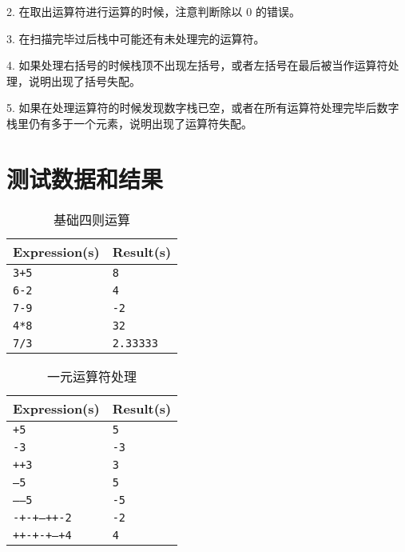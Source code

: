 \documentclass[UTF8]{ctexart}
\begin{document}
        2. 在取出运算符进行运算的时候，注意判断除以 0 的错误。

        3. 在扫描完毕过后栈中可能还有未处理完的运算符。

        4. 如果处理右括号的时候栈顶不出现左括号，或者左括号在最后被当作运算符处理，说明出现了括号失配。

        5. 如果在处理运算符的时候发现数字栈已空，或者在所有运算符处理完毕后数字栈里仍有多于一个元素，说明出现了运算符失配。

\section{测试数据和结果}


\begin{table}[!ht]
    \centering
    \begin{tabular}{|l|l|}
    \hline
        \textbf{Expression(s)} & \textbf{Result(s)} \\ \hline
        \texttt{3+5} & \texttt{8} \\ \hline
        \texttt{6-2} & \texttt{4} \\ \hline
        \texttt{7-9} & \texttt{-2} \\ \hline
        \texttt{4*8} & \texttt{32} \\ \hline
        \texttt{7/3} & \texttt{2.33333} \\ \hline
    \end{tabular}
    \caption{基础四则运算}
\end{table}

\begin{table}[!ht]
    \centering
    \begin{tabular}{|l|l|}
    \hline
        \textbf{Expression(s)} & \textbf{Result(s)} \\ \hline
        \texttt{+5} & \texttt{5 }\\ \hline
        \texttt{-3} & \texttt{-3 }\\ \hline
        \texttt{++3} & \texttt{3 }\\ \hline
        \texttt{--5} & \texttt{5 }\\ \hline
        \texttt{-----5} & \texttt{-5 }\\ \hline
        \texttt{-+-+--++-2} & \texttt{-2 }\\ \hline
        \texttt{++-+-+--+4} & \texttt{4 }\\ \hline
    \end{tabular}
    \caption{一元运算符处理}
\end{table}
\end{document}
